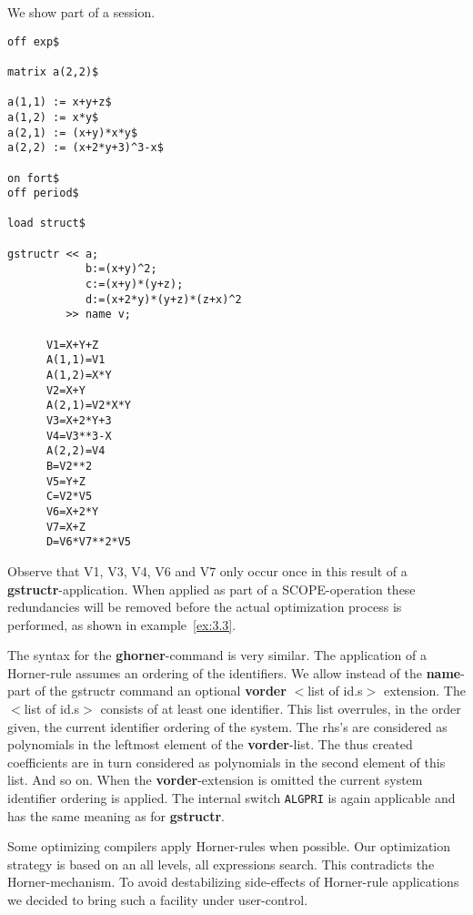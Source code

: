 \example\label{ex:3.1}

We show part of a {\REDUCE} session.
{\small
\begin{verbatim}
off exp$

matrix a(2,2)$

a(1,1) := x+y+z$
a(1,2) := x*y$
a(2,1) := (x+y)*x*y$
a(2,2) := (x+2*y+3)^3-x$

on fort$
off period$

load struct$

gstructr << a;
            b:=(x+y)^2;
            c:=(x+y)*(y+z);
            d:=(x+2*y)*(y+z)*(z+x)^2
         >> name v;

      V1=X+Y+Z
      A(1,1)=V1
      A(1,2)=X*Y
      V2=X+Y
      A(2,1)=V2*X*Y
      V3=X+2*Y+3
      V4=V3**3-X
      A(2,2)=V4
      B=V2**2
      V5=Y+Z
      C=V2*V5
      V6=X+2*Y
      V7=X+Z
      D=V6*V7**2*V5

\end{verbatim}
}

Observe that V1, V3, V4, V6 and V7 only occur once in this result of a
{\bf gstructr}-application. When applied as part of a SCOPE-operation
these redundancies will be removed before the actual optimization
process is performed, as shown in example~\ref{ex:3.3}.

 
The syntax for the {\bf ghorner}-command is very similar.  The
application of a Horner-rule assumes an ordering of the identifiers.
We allow instead of the {\bf name}-part of the {gstructr} command an
optional {\bf vorder} $<$list of id.s$>$ extension.  The $<$list of
id.s$>$ consists of at least one identifier. This list overrules, in
the order given, the current identifier ordering of the system. The
rhs's are considered as polynomials in the leftmost element of the
{\bf vorder}-list. The thus created coefficients are in turn
considered as polynomials in the second element of this list. And so
on. When the {\bf vorder}-extension is omitted the current system
identifier ordering is applied.  The internal switch {\tt ALGPRI} is again
applicable and has the same meaning as for {\bf gstructr}.

Some optimizing compilers apply Horner-rules when possible. Our
optimization strategy is based on an all levels, all expressions
search. This contradicts the Horner-mechanism. To avoid destabilizing
side-effects of Horner-rule applications we decided to bring such a
facility under user-control.

